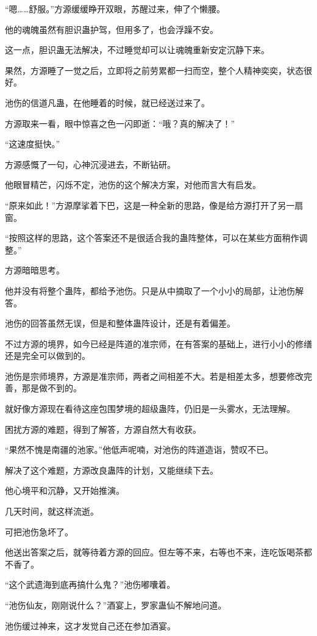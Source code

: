 \begin{this_body}
“嗯……舒服。”方源缓缓睁开双眼，苏醒过来，伸了个懒腰。

他的魂魄虽然有胆识蛊护驾，但用多了，也会浮躁不安。

这一点，胆识蛊无法解决，不过睡觉却可以让魂魄重新安定沉静下来。

果然，方源睡了一觉之后，立即将之前劳累都一扫而空，整个人精神奕奕，状态很好。

池伤的信道凡蛊，在他睡着的时候，就已经送过来了。

方源取来一看，眼中惊喜之色一闪即逝：“哦？真的解决了！”

“这速度挺快。”

方源感慨了一句，心神沉浸进去，不断钻研。

他眼冒精芒，闪烁不定，池伤的这个解决方案，对他而言大有启发。

“原来如此！”方源摩挲着下巴，这是一种全新的思路，像是给方源打开了另一扇窗。

“按照这样的思路，这个答案还不是很适合我的蛊阵整体，可以在某些方面稍作调整。”

方源暗暗思考。

他并没有将整个蛊阵，都给予池伤。只是从中摘取了一个小小的局部，让池伤解答。

池伤的回答虽然无误，但是和整体蛊阵设计，还是有着偏差。

不过方源的境界，如今已经是阵道的准宗师，在有答案的基础上，进行小小的修缮还是完全可以做到的。

池伤是宗师境界，方源是准宗师，两者之间相差不大。若是相差太多，想要修改完善，那是做不到的。

就好像方源现在看待这座包围梦境的超级蛊阵，仍旧是一头雾水，无法理解。

困扰方源的难题，得到了解答，方源自然大有收获。

“果然不愧是南疆的池家。”他低声呢喃，对池伤的阵道造诣，赞叹不已。

解决了这个难题，方源改良蛊阵的计划，又能继续下去。

他心境平和沉静，又开始推演。

几天时间，就这样流逝。

可把池伤急坏了。

他送出答案之后，就等待着方源的回应。但左等不来，右等也不来，连吃饭喝茶都不香了。

“这个武遗海到底再搞什么鬼？”池伤嘟囔着。

“池伤仙友，刚刚说什么？”酒宴上，罗家蛊仙不解地问道。

池伤缓过神来，这才发觉自己还在参加酒宴。


\end{this_body}
